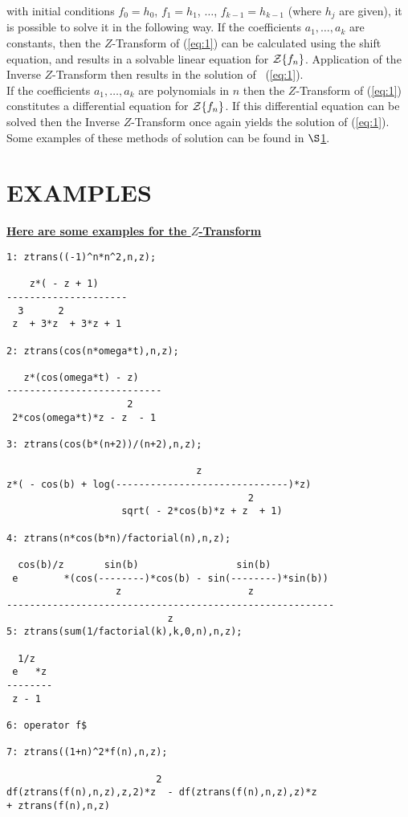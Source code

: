   with initial conditions
  $f_0 = h_0$, $f_1 = h_1$, $\ldots$, $f_{k-1} = h_{k-1}$ (where $h_j$
  are given), it is possible to solve it in the following way.
   If the coefficients $a_1, \ldots , a_k$ are constants, then the
  $Z$-Transform of (\ref{eq:1}) can be calculated using the shift
  equation, and results in a solvable linear equation for
  ${\cal Z} \{f_n\}$. Application of the Inverse $Z$-Transform
  then results in the solution of \ (\ref{eq:1}).\\
  If the coefficients $a_1, \ldots , a_k$ are polynomials in $n$ then
  the $Z$-Transform of (\ref{eq:1}) constitutes a differential
  equation for ${\cal Z} \{f_n\}$. If this differential equation can
  be solved then the Inverse $Z$-Transform once again yields the
  solution of (\ref{eq:1}).
  Some examples of these methods of solution can be found in
  $\S$\ref{sec:Examples}.

\section{EXAMPLES}
\label{sec:Examples}
\underline {{\bf Here are some examples for the $Z$-Transform}}\\
\begin{verbatim}
1: ztrans((-1)^n*n^2,n,z);

    z*( - z + 1)
---------------------
  3      2
 z  + 3*z  + 3*z + 1

2: ztrans(cos(n*omega*t),n,z);

   z*(cos(omega*t) - z)
---------------------------
                     2
 2*cos(omega*t)*z - z  - 1

3: ztrans(cos(b*(n+2))/(n+2),n,z);

                                 z
z*( - cos(b) + log(------------------------------)*z)
                                          2
                    sqrt( - 2*cos(b)*z + z  + 1)

4: ztrans(n*cos(b*n)/factorial(n),n,z);

  cos(b)/z       sin(b)                 sin(b)
 e        *(cos(--------)*cos(b) - sin(--------)*sin(b))
                   z                      z
---------------------------------------------------------
                            z
5: ztrans(sum(1/factorial(k),k,0,n),n,z);

  1/z
 e   *z
--------
 z - 1

6: operator f$

7: ztrans((1+n)^2*f(n),n,z);

                          2
df(ztrans(f(n),n,z),z,2)*z  - df(ztrans(f(n),n,z),z)*z
+ ztrans(f(n),n,z)

\end{verbatim}

